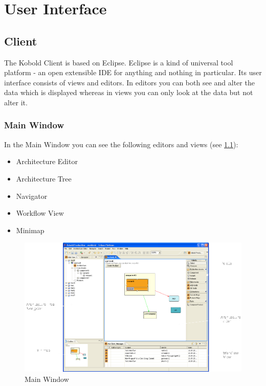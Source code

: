 \chapter{User Interface}

\section{Client}

The Kobold Client is based on Eclipse. Eclipse is a kind of universal tool 
platform - an open extensible IDE for anything and nothing in particular. Its 
user interface consists of views and editors. In editors you can both see and 
alter the data which is displayed whereas in views you can only look at the data 
but not alter it.

\subsection{Main Window}
In the Main Window you can see the following editors and views (see \ref{main}):
\begin{itemize}
	\item Architecture Editor
	\item Architecture Tree
	\item Navigator
	\item Workflow View
	\item Minimap
\end{itemize}

\begin{figure}[h!]
\begin{center}
\includegraphics[width=17cm]{main.png}
   \caption{Main Window}
\label{main}
\end{center}
\end{figure}\par

